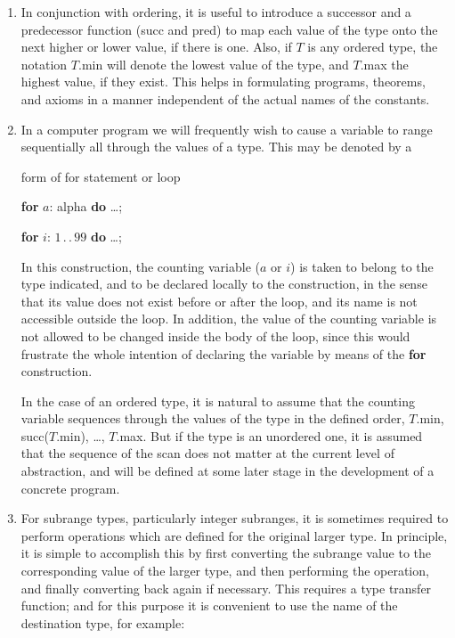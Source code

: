 \documentclass[twoside,11pt]{book}
\begin{document}
\begin{enumerate}[wide, nosep, label=(\arabic*)]
	\quad \textbf{if} May $\leqslant$ this month \& this month $\leqslant$ September \textbf{then}
	
	\qquad adopt summer timetables. 
	
	\noindent
	In other cases, the ordering of the values is quite irrelevant, and has no meaning to the programmer.
	
	\item In conjunction with ordering, it is useful to introduce a successor and a predecessor function (succ and pred) to map each value of the type onto the next higher or lower value, if there is one. Also, if $T$ is any ordered type, the notation $T$.min will denote the lowest value of the type, and $T$.max the highest value, if they exist. This helps in formulating programs, theorems, and axioms in a manner independent of the actual names of the constants.
	\item In a computer program we will frequently wish to cause a variable to range sequentially all through the values of a type. This may be denoted by a
	
	form of for statement or loop
	
	\quad \textbf{for} $a$: alpha \textbf{do} \dots;
	
	\quad \textbf{for} $i$: $1\,.\,.\,99$ \textbf{do} \dots;
	
	\noindent
	In this construction, the counting variable ($a$ or $i$) is taken to belong to the type indicated, and to be declared locally to the construction, in the sense that its value does not exist before or after the loop, and its name is not accessible outside the loop. In addition, the value of the counting variable is not allowed to be changed inside the body of the loop, since this would frustrate the whole intention of declaring the variable by means of the \textbf{for} construction.
	
	In the case of an ordered type, it is natural to assume that the counting variable sequences through the values of the type in the defined order, $T.$min, succ($T.$min), \dots, $T.$max. But if the type is an unordered one, it is assumed that the sequence of the scan does not matter at the current level of abstraction, and will be defined at some later stage in the development of a concrete program.
	
	\item For subrange types, particularly integer subranges, it is sometimes required to perform operations which are defined for the original larger type. In principle, it is simple to accomplish this by first converting the subrange value to the corresponding value of the larger type, and then performing the operation, and finally converting back again if necessary. This requires a type transfer function; and for this purpose it is convenient to use the name of the destination type, for example:
	

\end{enumerate}
\end{document}
